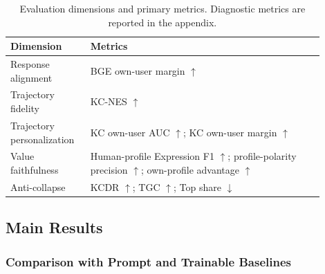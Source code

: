 \begin{table}[t]
\centering
\small
\caption{Evaluation dimensions and primary metrics. Diagnostic metrics are
reported in the appendix.}
\label{tab:evaluation_metrics}
\begin{tabular}{p{0.22\linewidth}p{0.68\linewidth}}
\toprule
\textbf{Dimension} & \textbf{Metrics} \\
\midrule
Response alignment & BGE own-user margin $\uparrow$ \\
Trajectory fidelity & KC-NES $\uparrow$ \\
Trajectory personalization & KC own-user AUC $\uparrow$; KC own-user margin $\uparrow$ \\
Value faithfulness & Human-profile Expression F1 $\uparrow$; profile-polarity precision $\uparrow$; own-profile advantage $\uparrow$ \\
Anti-collapse & KCDR $\uparrow$; TGC $\uparrow$; Top share $\downarrow$ \\
\bottomrule
\end{tabular}
\end{table}

\subsection{Main Results}
\label{sec:main_results}

\subsubsection{Comparison with Prompt and Trainable Baselines}


